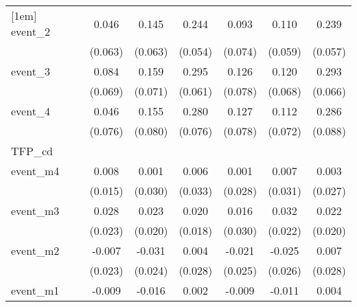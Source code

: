 {\begin{tabular}{l*{6}{c}}
[1em]
event\_2     &       0.046         &       0.145\sym{*}  &       0.244\sym{***}&       0.093         &       0.110         &       0.239\sym{***}\\
            &     (0.063)         &     (0.063)         &     (0.054)         &     (0.074)         &     (0.059)         &     (0.057)         \\
[1em]
event\_3     &       0.084         &       0.159\sym{*}  &       0.295\sym{***}&       0.126         &       0.120         &       0.293\sym{***}\\
            &     (0.069)         &     (0.071)         &     (0.061)         &     (0.078)         &     (0.068)         &     (0.066)         \\
[1em]
event\_4     &       0.046         &       0.155         &       0.280\sym{***}&       0.127         &       0.112         &       0.286\sym{**} \\
            &     (0.076)         &     (0.080)         &     (0.076)         &     (0.078)         &     (0.072)         &     (0.088)         \\
\hline
TFP\_cd      &                     &                     &                     &                     &                     &                     \\
event\_m4    &       0.008         &       0.001         &       0.006         &       0.001         &       0.007         &       0.003         \\
            &     (0.015)         &     (0.030)         &     (0.033)         &     (0.028)         &     (0.031)         &     (0.027)         \\
[1em]
event\_m3    &       0.028         &       0.023         &       0.020         &       0.016         &       0.032         &       0.022         \\
            &     (0.023)         &     (0.020)         &     (0.018)         &     (0.030)         &     (0.022)         &     (0.020)         \\
[1em]
event\_m2    &      -0.007         &      -0.031         &       0.004         &      -0.021         &      -0.025         &       0.007         \\
            &     (0.023)         &     (0.024)         &     (0.028)         &     (0.025)         &     (0.026)         &     (0.028)         \\
[1em]
event\_m1    &      -0.009         &      -0.016         &       0.002         &      -0.009         &      -0.011         &       0.004         \\

\end{tabular}}

